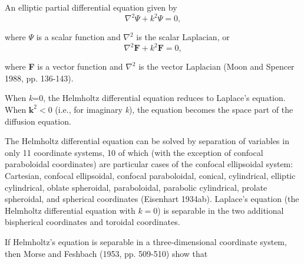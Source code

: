 \documentclass[a4paper]{article}
\begin{document}
\noindent \tiny {} \vspace{0.5cm}




\noindent{\color{ForestGreen}\rule{\linewidth}{0.1mm} }

\noindent \scriptsize An {\color{Emerald} elliptic partial differential equation} given by 
\begin{equation} \label{eq1}
\nabla^2 \Psi + k^2 \Psi = 0, 
\end{equation}

\noindent where $\Psi$ is a {\color{Emerald} scalar function} and $\nabla^2$ is the  scalar {\color{Emerald}Laplacian}, or 
\begin{equation} \label{eq2}
\nabla^2 \textbf{F} + k^2 \textbf{F} = 0,  
\end{equation} 


\noindent where \textbf{F} is a {\color{Emerald}vector function} and $\nabla ^2$ is the vector Laplacian (Moon and Spencer 1988, pp. 136-143).\vspace{0.5cm} 

\noindent When \textit{k}=0, the Helmholtz differential equation reduces to {\color{Emerald}Laplace's equation}. When $\textbf{k}^2<0$ (i.e., for imaginary \textit{k}), the equation becomes the space part of the diffusion equation. \vspace{0.5cm} 

\noindent The Helmholtz differential equation can be solved by {\color{Emerald}separation of variables} in only 11 coordinate systems, 10 of which (with the exception of {\color{Emerald}confocal paraboloidal coordinates}) are particular cases of the {\color{Emerald}confocal ellipsoidal} system: {\color{Emerald}Cartesian, confocal ellipsoidal, confocal paraboloidal, conical, cylindrical, elliptic cylindrical, oblate spheroidal, paraboloidal, parabolic cylindrical, prolate spheroidal, and spherical coordinates} (Eisenhart 1934ab). {\color{Emerald}Laplace's equation} (the Helmholtz differential equation with $k=0$) is separable in the two additional {\color{Emerald} bispherical coordinates} and toroidal {\color{Emerald}coordinates.} \vspace{0.5cm}

\noindent If Helmholtz's equation is separable in a three-dimensional coordinate system, then Morse and Feshbach (1953, pp. 509-510) show that 
\end{document}
